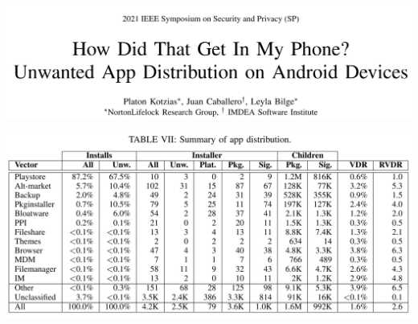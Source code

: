 \usetikzlibrary{calc}
\begin{frame}
\includegraphics[width=\textwidth]{../intro/kotzias-on-device-title}
\end{frame}

\begin{frame}
\includegraphics[width=\textwidth]{../intro/kotzias-install-src-tbl}
\end{frame}

